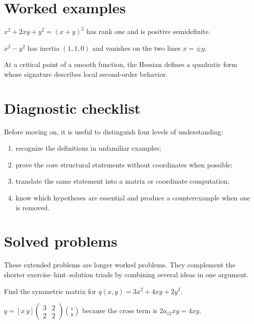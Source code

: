 \section{Worked examples}

\begin{example}\label{ex:i17-worked-01}
$x^2+2xy+y^2=(x+y)^2$ has rank one and is positive semidefinite.
\end{example}

\begin{example}\label{ex:i17-worked-02}
$x^2-y^2$ has inertia $(1,1,0)$ and vanishes on the two lines $x=\pm y$.
\end{example}

\begin{example}\label{ex:i17-worked-03}
At a critical point of a smooth function, the Hessian defines a quadratic form whose signature describes local second-order behavior.
\end{example}

\section{Diagnostic checklist}
Before moving on, it is useful to distinguish four levels of understanding:
\begin{enumerate}
\item recognize the definitions in unfamiliar examples;
\item prove the core structural statements without coordinates when possible;
\item translate the same statement into a matrix or coordinate computation;
\item know which hypotheses are essential and produce a counterexample when one is removed.
\end{enumerate}

\section{Solved problems}
These extended problems are longer worked problems. They complement the shorter exercise--hint--solution triads by combining several ideas in one argument.

\begin{problem}\label{prob:i17-problem-01}
Find the symmetric matrix for $q(x,y)=3x^2+4xy+2y^2$.
\end{problem}
\begin{solution}
$q=[x\ y]\begin{pmatrix}3&2\\2&2\end{pmatrix}\binom{x}{y}$ because the cross term is $2a_{12}xy=4xy$.
\end{solution}


